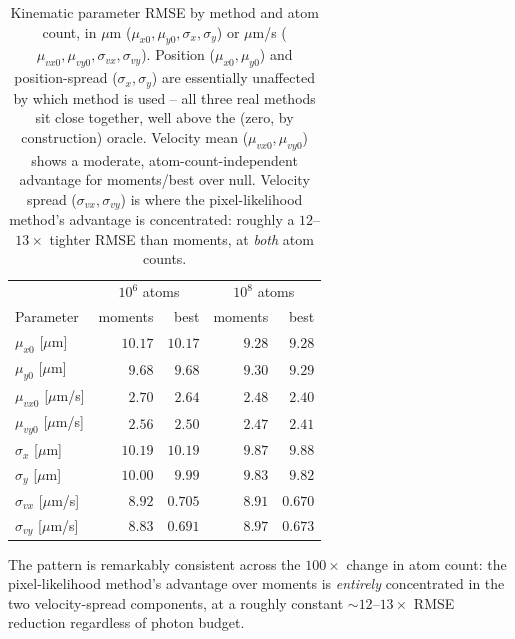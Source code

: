 \documentclass[11pt,a4paper]{article}
\begin{document}
\begin{table}[htbp]
\centering
\caption{Kinematic parameter RMSE by method and atom count, in
$\mu$m ($\mu_{x0},\mu_{y0},\sigma_x,\sigma_y$) or $\mu$m/s
($\mu_{vx0},\mu_{vy0},\sigma_{vx},\sigma_{vy}$). Position
($\mu_{x0},\mu_{y0}$) and position-spread ($\sigma_x,\sigma_y$) are
essentially unaffected by which method is used -- all three real methods
sit close together, well above the (zero, by construction) oracle. Velocity
mean ($\mu_{vx0},\mu_{vy0}$) shows a moderate, atom-count-independent
advantage for moments/best over null. Velocity spread
($\sigma_{vx},\sigma_{vy}$) is where the pixel-likelihood method's
advantage is concentrated: roughly a $12$--$13\times$ tighter RMSE than
moments, at \emph{both} atom counts.}
\label{tab:theta-rmse}
\begin{tabular}{lrrrr}
\toprule
& \multicolumn{2}{c}{$10^6$ atoms} & \multicolumn{2}{c}{$10^8$ atoms} \\
Parameter & moments & best & moments & best \\
\midrule
$\mu_{x0}$ [$\mu$m]        & $10.17$ & $10.17$ & $9.28$ & $9.28$ \\
$\mu_{y0}$ [$\mu$m]        & $9.68$  & $9.68$  & $9.30$ & $9.29$ \\
$\mu_{vx0}$ [$\mu$m/s]     & $2.70$  & $2.64$  & $2.48$ & $2.40$ \\
$\mu_{vy0}$ [$\mu$m/s]     & $2.56$  & $2.50$  & $2.47$ & $2.41$ \\
$\sigma_x$ [$\mu$m]        & $10.19$ & $10.19$ & $9.87$ & $9.88$ \\
$\sigma_y$ [$\mu$m]        & $10.00$ & $9.99$  & $9.83$ & $9.82$ \\
$\sigma_{vx}$ [$\mu$m/s]   & $8.92$  & $\mathbf{0.705}$ & $8.91$ & $\mathbf{0.670}$ \\
$\sigma_{vy}$ [$\mu$m/s]   & $8.83$  & $\mathbf{0.691}$ & $8.97$ & $\mathbf{0.673}$ \\
\bottomrule
\end{tabular}
\end{table}

The pattern is remarkably consistent across the $100\times$ change in atom
count: the pixel-likelihood method's advantage over moments is
\emph{entirely} concentrated in the two velocity-spread components, at a
roughly constant $\sim\!12$--$13\times$ RMSE reduction regardless of photon
budget.
\end{document}
